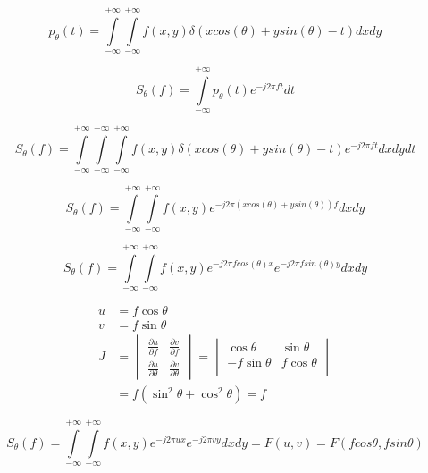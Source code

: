 \documentclass[journal, onecolumn, 11pt]{IEEEtran}
\begin{document}
\begin{equation}
    p_{\theta}(t) = \int\limits_{-\infty}^{+\infty}\int\limits_{-\infty}^{+\infty}f(x,y)\delta(xcos(\theta)+ysin(\theta)-t) dx dy
\end{equation}




\begin{equation}
    S_{\theta}(f) = \int\limits_{-\infty}^{+\infty}p_{\theta}(t)e^{-j2\pi ft}dt
\end{equation}

\begin{equation}
    S_{\theta}(f) = \int\limits_{-\infty}^{+\infty}\int\limits_{-\infty}^{+\infty}\int\limits_{-\infty}^{+\infty}f(x,y)\delta(xcos(\theta)+ysin(\theta)-t) e^{-j2\pi ft} dx dy dt
\end{equation}

\begin{equation}
    S_{\theta}(f) = \int\limits_{-\infty}^{+\infty}\int\limits_{-\infty}^{+\infty}f(x,y)e^{-j2\pi \left(xcos(\theta)+ysin(\theta)\right)f}dxdy
\end{equation}

\begin{equation}
    S_{\theta}(f) = \int\limits_{-\infty}^{+\infty}\int\limits_{-\infty}^{+\infty}f(x,y)e^{-j2\pi fcos(\theta) x}e^{-j2\pi fsin(\theta) y}dxdy
\end{equation}

\begin{align}
	u &= f \cos\theta \\
	v &= f \sin\theta \\
	J &= \begin{vmatrix}
		\frac{\partial u}{\partial f} & \frac{\partial v}{\partial f} \\ 
		\frac{\partial u}{\partial \theta} & \frac{\partial v}{\partial \theta} 
	\end{vmatrix} = \begin{vmatrix}
		\cos\theta & \sin\theta \\ 
		-f\sin\theta & f\cos\theta \\
	\end{vmatrix} \\
	&= f(\sin^2\theta + \cos^2\theta) = f
	\end{align}



\begin{equation}
    S_{\theta}(f) = \int\limits_{-\infty}^{+\infty}\int\limits_{-\infty}^{+\infty}f(x,y)e^{-j2\pi u x}e^{-j2\pi v y}dxdy = F(u,v) = F(f cos\theta,f sin\theta)
\end{equation}
\end{document}
